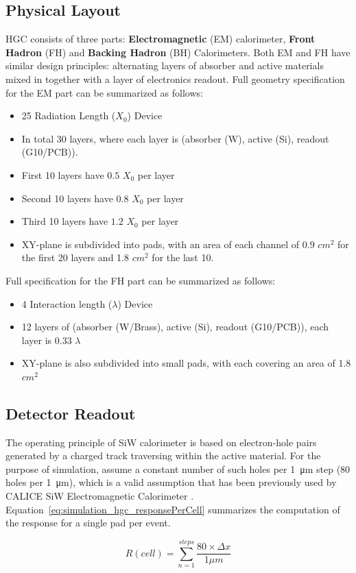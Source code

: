 \subsection{Physical Layout}
HGC consists of three parts: \textbf{Electromagnetic} (EM) calorimeter, \textbf{Front Hadron} (FH) and \textbf{Backing Hadron} (BH) Calorimeters. Both EM and FH have similar design principles: alternating layers of absorber and active materials mixed in together with a layer of electronics readout. Full geometry specification for the EM part can be summarized as follows:
\begin{itemize}
    \item 25 Radiation Length ($X_{0}$) Device
    \item In total 30 layers, where each layer is (absorber (W), active (Si), readout (G10/PCB)).
    \item First 10 layers have $0.5$ $X_{0}$ per layer
    \item Second 10 layers have $0.8$ $X_{0}$ per layer
    \item Third 10 layers have $1.2$ $X_{0}$ per layer
    \item XY-plane is subdivided into pads, with an area of each channel of 0.9 $cm^2$ for the first 20 layers and 1.8 $cm^2$ for the last 10.
\end{itemize}
Full specification for the FH part can be summarized as follows:
\begin{itemize}
    \item 4 Interaction length ($\lambda$) Device
    \item 12 layers of (absorber (W/Brass), active (Si), readout (G10/PCB)), each layer is $0.33$ $\lambda$
    \item XY-plane is also subdivided into small pads, with each covering an area of 1.8 $cm^2$
\end{itemize}

\subsection{Detector Readout} \label{subsection:simulations_hgc_readout}
The operating principle of SiW calorimeter is based on electron-hole pairs generated by a charged track traversing within the active material. For the purpose of simulation, assume a constant number of such holes per \SI{1}{\micro\metre} step (80 holes per \SI{1}{\micro\metre}), which is a valid assumption that has been previously used by {\sc CALICE} SiW Electromagnetic Calorimeter \cite{Adloff:2008aa}. Equation~\ref{eq:simulation_hgc_responsePerCell} summarizes the computation of the response for a single pad per event.
\begin{center}
    \begin{equation}
        \label{eq:simulation_hgc_responsePerCell}
        {R(cell)} = {\sum_{n=1}^{steps} \frac{80\times \Delta x}{1\mu m}}
   \end{equation}
\end{center}

